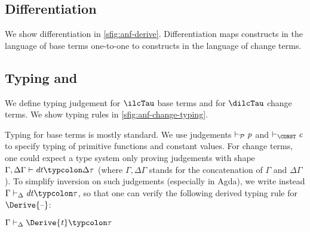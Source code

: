 \subsection{Differentiation}
\label{sec:bsos-anf-derive}
We show differentiation in \cref{sfig:anf-derive}.
Differentiation maps constructs in the language of base terms
one-to-one to constructs in the language of change terms.

\subsection{Typing \ilcTau{} and \dilcTau}
\label{sec:bsos-anf-typing}

We define typing judgement for \ensuremath{\ilcTau} base terms and for \ensuremath{\dilcTau} change
terms. We show typing rules in
\cref{sfig:anf-change-typing}.

Typing for base terms is mostly standard. We use judgements \ensuremath{\vdash_{\mathcal{P}}\Varid{p}} and
\ensuremath{\vdash_{\CONST}\Varid{c}} to specify typing of primitive functions and constant values.
%
For change terms, one could expect a type system only proving
judgements with shape \ensuremath{\Gamma,\Delta \Gamma\vdash\Varid{dt}\typcolon\Delta \tau} (where
\ensuremath{\Gamma,\Delta \Gamma} stands for the concatenation of \ensuremath{\Gamma} and
\ensuremath{\Delta \Gamma}). To simplify inversion on such judgements (especially
in Agda), we write instead \ensuremath{\Gamma\vdash_{\Delta}\Varid{dt}\typcolon\tau}, so that
one can verify the following derived typing rule for \ensuremath{\Derive{\text{\textendash}}}:
\begin{typing}
  {\ensuremath{\Gamma\vdash_{\Delta}\Derive{\Varid{t}}\typcolon\tau}}
\end{typing}

